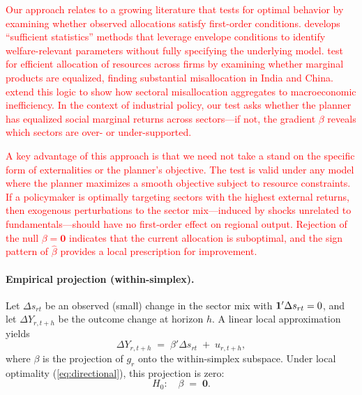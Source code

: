 \documentclass{article}
\begin{document}
\textcolor{red}{Our approach relates to a growing literature that tests for optimal behavior by examining whether observed allocations satisfy first-order conditions. \citet{chetty2009sufficient} develops ``sufficient statistics'' methods that leverage envelope conditions to identify welfare-relevant parameters without fully specifying the underlying model. \citet{hsieh2009misallocation} test for efficient allocation of resources across firms by examining whether marginal products are equalized, finding substantial misallocation in India and China. \citet{baqaee2020productivity} extend this logic to show how sectoral misallocation aggregates to macroeconomic inefficiency. In the context of industrial policy, our test asks whether the planner has equalized social marginal returns across sectors---if not, the gradient $\beta$ reveals which sectors are over- or under-supported.}

\textcolor{red}{A key advantage of this approach is that we need not take a stand on the specific form of externalities or the planner's objective. The test is valid under any model where the planner maximizes a smooth objective subject to resource constraints. If a policymaker is optimally targeting sectors with the highest external returns, then exogenous perturbations to the sector mix---induced by shocks unrelated to fundamentals---should have no first-order effect on regional output. Rejection of the null $\beta = \mathbf{0}$ indicates that the current allocation is suboptimal, and the sign pattern of $\hat{\beta}$ provides a local prescription for improvement.}





\paragraph{Empirical projection (within-simplex).}
Let $\Delta s_{rt}$ be an observed (small) change in the sector mix with $\mathbf{1}'\Delta s_{rt}=0$, and let
$\Delta Y_{r,t+h}$ be the outcome change at horizon $h$.
A linear local approximation yields
\begin{equation}
    \label{eq:projection}
    \Delta Y_{r,t+h} \;=\; \beta' \Delta s_{rt} \;+\; u_{r,t+h},
\end{equation}
where $\beta$ is the projection of $g_r$ onto the within-simplex subspace.
Under local optimality (\ref{eq:directional}), this projection is zero:
\begin{equation}
    \label{eq:null}
    H_0:\quad \beta \;=\; \mathbf{0}.
\end{equation}
\end{document}
